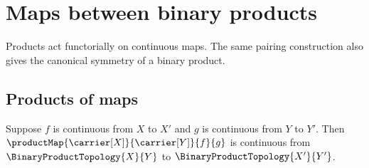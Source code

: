 \section{Maps between binary products}



Products act functorially on continuous maps.  The same pairing construction
also gives the canonical symmetry of a binary product.

\subsection{Products of maps}

\begin{theorem}\label{continuous_product_map}
    Suppose $f$ is continuous from $X$ to $X'$ and
        $g$ is continuous from $Y$ to $Y'$.
    Then $\productMap{\carrier[X]}{\carrier[Y]}{f}{g}$ is continuous
        from $\BinaryProductTopology{X}{Y}$ to
        $\BinaryProductTopology{X'}{Y'}$.
\end{theorem}

